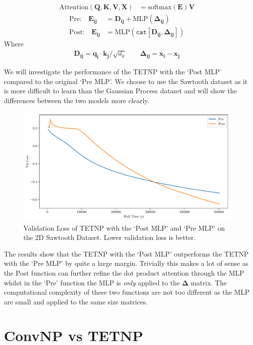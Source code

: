 \documentclass[../../main.tex]{subfiles}
\begin{document}
\begin{align}
	\text{Attention}(\bm{Q}, \bm{K}, \bm{V}, \bm{X}) &= \text{softmax}\left(\bm{E} \right) \bm{V}
\end{align}
\begin{align}
	\text{Pre:} \quad \bm{E_{ij}} &= \bm{D_{ij}}+ \text{MLP}(\bm{\Delta_{ij}})\\
    \text{Post:} \quad \bm{E_{ij}} &= \text{MLP}(\texttt{cat}[ \bm{D_{ij}}, \bm{\Delta_{ij}}])
\end{align}
Where 
\begin{align}
     \bm{D_{ij}} = \bm{q_i} \cdot \bm{k_j}  /\sqrt{d_k} \quad \quad    \bm{\Delta_{ij}} = \bm{x_i} - \bm{x_j}
\end{align}


We will investigate the performance of the TETNP with the `Post MLP' compared to the original `Pre MLP'. We choose to use the Sawtooth dataset as it is more difficult to learn than the Gaussian Process dataset and will show the differences between the two models more clearly. 


\begin{figure}[H]
    \centering
    \includegraphics[width=0.6\linewidth]{./fig/post-pre-kernel.pdf}
    \caption{Validation Loss of TETNP with the `Post MLP' and `Pre MLP' on the 2D Sawtooth Dataset. Lower validation loss is better.}
    \label{fig:post-pre-kernel}
\end{figure}


The results show that the TETNP with the `Post MLP' outperforms the TETNP with the `Pre MLP' by quite a large margin. Trivially this makes a lot of sense as the Post function can further refine the dot product attention through the MLP whilst in the `Pre' function the MLP is \emph{only} applied to the $\bm{\Delta}$ matrix. The computational complexity of these two functions are not too different as the MLP are small and applied to the same size matrices. 


\section{ConvNP vs TETNP}
\end{document}
